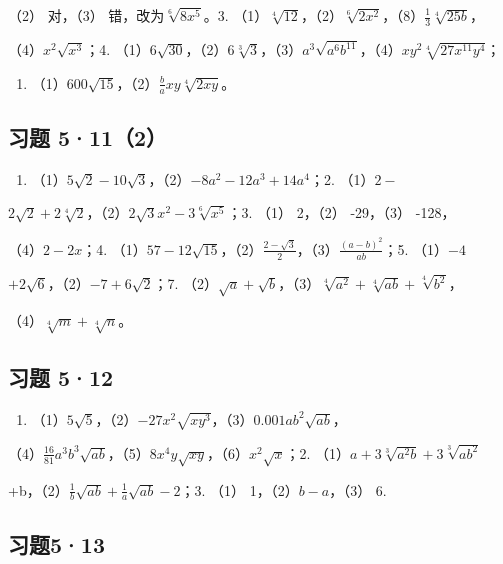 （2） 对，（3） 错，改为\(\sqrt[6]{8x^{5}}\)。3.
（1）\(\sqrt[4]{12}\)，（2）\(\sqrt[6]{2x^{2}}\)，（8）\(\frac{1}{3}\sqrt[4]{25b}\)，

（4）\(x^{2}\sqrt{x^{3}}\)；4.
（1）\(6\sqrt{30}\)，（2）\(6\sqrt[3]{3}\)，（3）\(a^{3}\sqrt{a^{6}b^{11}}\)，（4）\(xy^{2}\sqrt[4]{27x^{11}y^{4}}\)；

\begin{enumerate}[start=5]
\item
  （1）\(600\sqrt{15}\)，（2）\(\frac{b}{a} xy\sqrt[4]{2xy}\)。
\end{enumerate}

\subsection{习题 5·11（2）}

\begin{enumerate}
\item
  （1）\(5\sqrt{2} - 10\sqrt{3}\)，（2）\(-8a^2 - 12a^3 + 14a^4\)；2.
  （1）\(2-\)
\end{enumerate}

\(2\sqrt{2} + 2\sqrt[4]{2}\)，（2）\(2\sqrt{3}x^{2} - 3\sqrt[6]{x^{5}}\)；3.
（1） 2，（2） -29，（3） -128，

（4）\(2 - 2x\)；4.
（1）\(57 - 12\sqrt{15}\)，（2）\(\frac{2 - \sqrt{3}}{2}\)，（3）\(\frac{(a - b)^2}{ab}\)；5.
（1）\(-4\)

\(+2\sqrt{6}\)，（2）\(-7+6\sqrt{2}\)；7.
（2）\(\sqrt{a}+\sqrt{b}\)，（3）\(\sqrt[4]{a^{2}}+\sqrt[4]{ab}+\sqrt[4]{b^{2}}\)，

（4）\(\sqrt[4]{m} + \sqrt[4]{n}\)。

\subsection{习题 5·12}

\begin{enumerate}
\item
  （1）\(5\sqrt{5}\)，（2）\(-27x^{2}\sqrt{xy^{3}}\)，（3）\(0.001ab^{2}\sqrt{ab}\)，
\end{enumerate}

（4）\(\frac{16}{81} a^3 b^3 \sqrt{ab}\)，（5）\(8x^4 y \sqrt{xy}\)，（6）\(x^2 \sqrt{x}\)；2.
（1）\(a + 3\sqrt[3]{a^2 b} + 3\sqrt[3]{ab^2}\)

+b，（2）\(\frac{1}{b}\sqrt{ab} + \frac{1}{a}\sqrt{ab} - 2\)；3. （1）
1，（2）\(b - a\)，（3） 6.

\subsection{习题5·13}

